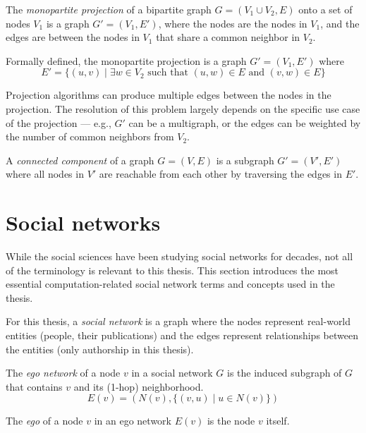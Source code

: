 \begin{definition}\label{def:monopartite-projection}
    The \textit{monopartite projection} of a bipartite graph $G = (V_1 \cup V_2, E)$ onto a set of nodes $V_1$ is a graph $G' = (V_1, E')$, 
    where the nodes are the nodes in $V_1$, and the edges are between the nodes in $V_1$ that share a common neighbor in $V_2$.
    
    Formally defined, the monopartite projection is a graph $G' = (V_1, E')$ where
    $$
    E' = \{ (u, v) \mid \exists w \in V_2 \text{ such that } (u, w) \in E \text{ and } (v, w) \in E \}
    $$

    Projection algorithms can produce multiple edges between the nodes in the projection.
    The resolution of this problem largely depends on the specific use case of the projection — e.g., $G'$ can be a multigraph, or the edges can be weighted by the number of common neighbors from $V_2$.
    
\begin{definition}
    A \textit{connected component} of a graph $G = (V, E)$ is a subgraph $G' = (V', E')$ where all nodes in $V'$ are reachable from each other by traversing the edges in $E'$.
\end{definition}

\end{definition}
\section{Social networks}

While the social sciences have been studying social networks for decades, not all of the terminology is relevant to this thesis.
This section introduces the most essential computation-related social network terms and concepts used in the thesis.

For this thesis, a \textit{social network} is a graph where the nodes represent real-world entities (people, their publications) and the edges represent relationships between the entities (only authorship in this thesis).

\begin{definition}
    The \textit{ego network} of a node $v$ in a social network $G$ is the induced subgraph of $G$ that contains $v$ and its (1-hop) neighborhood.
    $$
    E(v) = (N(v), \{ (v, u) \mid u \in N(v) \})
    $$
\end{definition}

\begin{definition}
    The \textit{ego} of a node $v$ in an ego network $E(v)$ is the node $v$ itself.
\end{definition}

